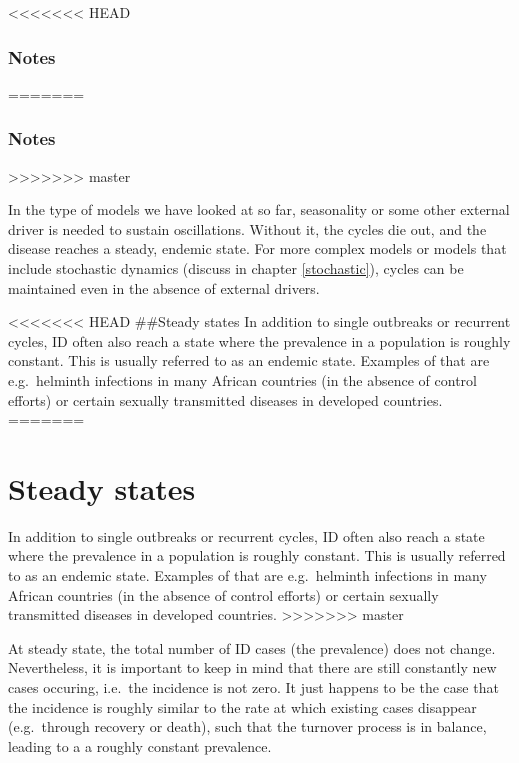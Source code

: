 \documentclass[]{book}
\theoremstyle{definition}
\theoremstyle{definition}
\theoremstyle{definition}
\theoremstyle{remark}
\begin{document}
<<<<<<< HEAD
\hypertarget{mynotebox}{%
\subsubsection{Notes}\label{mynotebox}}
=======
\subsubsection{Notes}\label{mynotebox}
>>>>>>> master

In the type of models we have looked at so far, seasonality or some
other external driver is needed to sustain oscillations. Without it, the
cycles die out, and the disease reaches a steady, endemic state. For
more complex models or models that include stochastic dynamics (discuss
in chapter \ref{stochastic}), cycles can be maintained even in the
absence of external drivers.

<<<<<<< HEAD
\#\#Steady states In addition to single outbreaks or recurrent cycles,
ID often also reach a state where the prevalence in a population is
roughly constant. This is usually referred to as an endemic state.
Examples of that are e.g.~helminth infections in many African countries
(in the absence of control efforts) or certain sexually transmitted
diseases in developed countries.
=======
\section{Steady states}\label{steady-states}

In addition to single outbreaks or recurrent cycles, ID often also reach
a state where the prevalence in a population is roughly constant. This
is usually referred to as an endemic state. Examples of that are
e.g.~helminth infections in many African countries (in the absence of
control efforts) or certain sexually transmitted diseases in developed
countries.
>>>>>>> master

At steady state, the total number of ID cases (the prevalence) does not
change. Nevertheless, it is important to keep in mind that there are
still constantly new cases occuring, i.e.~the incidence is not zero. It
just happens to be the case that the incidence is roughly similar to the
rate at which existing cases disappear (e.g.~through recovery or death),
such that the turnover process is in balance, leading to a a roughly
constant prevalence.
\end{document}
